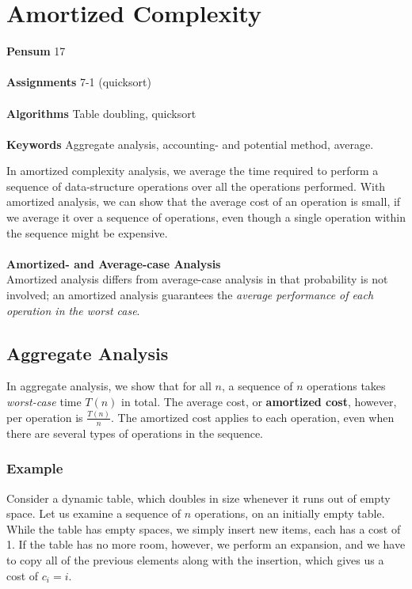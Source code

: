 
\chapter{Amortized Complexity}
\label{ch:amortizedcomplexity}

\textbf{Pensum} 17 \cite{clrs} \\\\
\textbf{Assignments} 7-1 (quicksort) \\\\
\textbf{Algorithms} Table doubling, quicksort \\\\
\textbf{Keywords} Aggregate analysis, accounting- and potential method, average.
\vspace{1in}

\noindent In amortized complexity analysis, we average the time required to
perform a sequence of data-structure operations over all the operations
performed. With amortized analysis, we can show that the average cost of an
operation is small, if we average it over a sequence of operations, even
though a single operation within the sequence might be expensive.
\\\\
\noindent \textbf{Amortized- and Average-case Analysis} \\
Amortized analysis differs from average-case analysis in that probability is
not involved; an amortized analysis guarantees the \textit{average performance
of each operation in the worst case}.

\newpage
\section{Aggregate Analysis}
In aggregate analysis, we show that for all $n$, a sequence of $n$ operations
takes \textit{worst-case} time $T(n)$ in total. The average cost, or \textbf{
amortized cost}, however, per operation is $\frac{T(n)}{n}$. The amortized
cost applies to each operation, even when there are several types of
operations in the sequence.

\subsection{Example}
Consider a dynamic table, which doubles in size whenever it runs out of empty
space. Let us examine a sequence of $n$ operations, on an initially empty
table. While the table has empty spaces, we simply insert new items, each has
a cost of 1. If the table has no more room, however, we perform an expansion,
and we have to copy all of the previous elements along with the insertion,
which gives us a cost of $c_i = i$.

